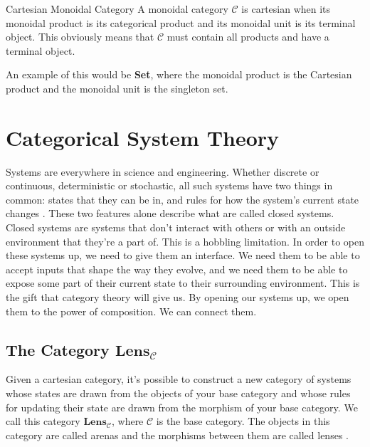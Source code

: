 \documentclass[12pt]{article}
\newcounter{examp}
\begin{document}
\begin{definition}{Cartesian Monoidal Category}{}
  A monoidal category $\mathcal{C}$ is cartesian when its monoidal product is its categorical product and its monoidal unit is its terminal object.
  This obviously means that $\mathcal{C}$ must contain all products and have a terminal object.
\end{definition}
An example of this would be \textbf{Set}, where the monoidal product is the Cartesian product and the monoidal unit is the singleton set.






\section*{Categorical System Theory}
Systems are everywhere in science and engineering.
Whether discrete or continuous, deterministic or stochastic, all such systems have two things in common: states that they can be in, and rules for how the system's current state changes \cite{myers2022categorical}.
These two features alone describe what are called closed systems.
Closed systems are systems that don't interact with others or with an outside environment that they're a part of.
This is a hobbling limitation.
In order to open these systems up, we need to give them an interface.
We need them to be able to accept inputs that shape the way they evolve, and we need them to be able to expose some part of their current state to their surrounding environment.
This is the gift that category theory will give us.
By opening our systems up, we open them to the power of composition.
We can connect them.




\subsection*{The Category $\textbf{Lens}_{\mathcal{C}}$}
Given a cartesian category, it's possible to construct a new category of systems whose states are drawn from the objects of your base category and whose rules for updating their state are drawn from the morphism of your base category.
We call this category $\textbf{Lens}_{\mathcal{C}}$, where $\mathcal{C}$ is the base category.
The objects in this category are called arenas and the morphisms between them are called lenses \cite{myers2022categorical}.
\end{document}
